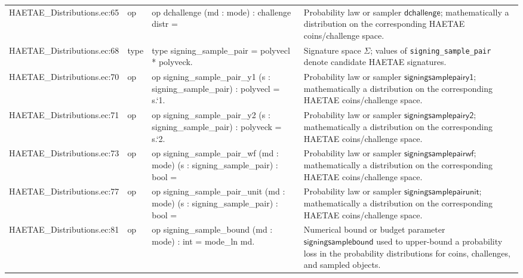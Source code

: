 \documentclass[10pt]{article}
\newcommand{\EC}[1]{\texttt{#1}}
\begin{document}
\begin{longtable}{L{0.11\textwidth}L{0.055\textwidth}L{0.385\textwidth}L{0.41\textwidth}}
HAETAE\_\allowbreak{}Distributions.\allowbreak{}ec:\allowbreak{}65 & op & {\ttfamily\scriptsize op dchallenge (md : mode) : challenge distr =} & Probability law or sampler $\mathsf{dchallenge}$; mathematically a distribution on the corresponding HAETAE coins/challenge space. \\
HAETAE\_\allowbreak{}Distributions.\allowbreak{}ec:\allowbreak{}68 & type & {\ttfamily\scriptsize type signing\_\allowbreak{}sample\_\allowbreak{}pair = polyvecl * polyveck.} & Signature space $\Sigma$; values of \EC{signing\_sample\_pair} denote candidate HAETAE signatures. \\
HAETAE\_\allowbreak{}Distributions.\allowbreak{}ec:\allowbreak{}70 & op & {\ttfamily\scriptsize op signing\_\allowbreak{}sample\_\allowbreak{}pair\_\allowbreak{}y1 (s : signing\_\allowbreak{}sample\_\allowbreak{}pair) : polyvecl = s.`1.} & Probability law or sampler $\mathsf{signingsamplepairy1}$; mathematically a distribution on the corresponding HAETAE coins/challenge space. \\
HAETAE\_\allowbreak{}Distributions.\allowbreak{}ec:\allowbreak{}71 & op & {\ttfamily\scriptsize op signing\_\allowbreak{}sample\_\allowbreak{}pair\_\allowbreak{}y2 (s : signing\_\allowbreak{}sample\_\allowbreak{}pair) : polyveck = s.`2.} & Probability law or sampler $\mathsf{signingsamplepairy2}$; mathematically a distribution on the corresponding HAETAE coins/challenge space. \\
HAETAE\_\allowbreak{}Distributions.\allowbreak{}ec:\allowbreak{}73 & op & {\ttfamily\scriptsize op signing\_\allowbreak{}sample\_\allowbreak{}pair\_\allowbreak{}wf (md : mode) (s : signing\_\allowbreak{}sample\_\allowbreak{}pair) : bool =} & Probability law or sampler $\mathsf{signingsamplepairwf}$; mathematically a distribution on the corresponding HAETAE coins/challenge space. \\
HAETAE\_\allowbreak{}Distributions.\allowbreak{}ec:\allowbreak{}77 & op & {\ttfamily\scriptsize op signing\_\allowbreak{}sample\_\allowbreak{}pair\_\allowbreak{}unit (md : mode) (s : signing\_\allowbreak{}sample\_\allowbreak{}pair) : bool =} & Probability law or sampler $\mathsf{signingsamplepairunit}$; mathematically a distribution on the corresponding HAETAE coins/challenge space. \\
HAETAE\_\allowbreak{}Distributions.\allowbreak{}ec:\allowbreak{}81 & op & {\ttfamily\scriptsize op signing\_\allowbreak{}sample\_\allowbreak{}bound (md : mode) : int = mode\_\allowbreak{}ln md.} & Numerical bound or budget parameter $\mathsf{signingsamplebound}$ used to upper-bound a probability loss in the probability distributions for coins, challenges, and sampled objects. \\

\end{longtable}
\end{document}
